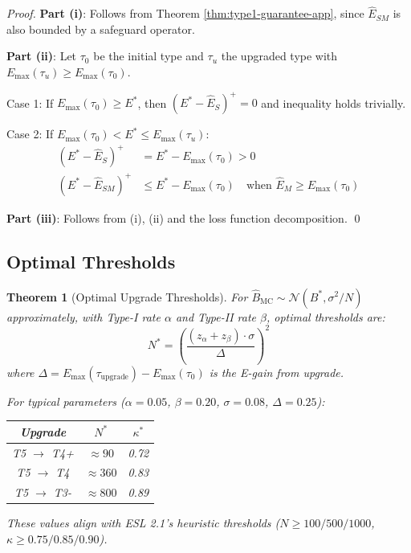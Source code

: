 \documentclass[11pt,a4paper]{article}
\newtheorem{theorem}{Theorem}[section]
\begin{document}
\begin{proof}
\textbf{Part (i)}: Follows from Theorem \ref{thm:type1-guarantee-app}, since $\hat{E}_{SM}$ is also bounded by a safeguard operator.

\textbf{Part (ii)}: Let $\tau_0$ be the initial type and $\tau_u$ the upgraded type with $E_{\max}(\tau_u) \geq E_{\max}(\tau_0)$.

Case 1: If $E_{\max}(\tau_0) \geq E^*$, then $(E^* - \hat{E}_S)^+ = 0$ and inequality holds trivially.

Case 2: If $E_{\max}(\tau_0) < E^* \leq E_{\max}(\tau_u)$:
\begin{align*}
(E^* - \hat{E}_S)^+ &= E^* - E_{\max}(\tau_0) > 0 \\
(E^* - \hat{E}_{SM})^+ &\leq E^* - E_{\max}(\tau_0) \quad \text{when } \hat{E}_M \geq E_{\max}(\tau_0)
\end{align*}

\textbf{Part (iii)}: Follows from (i), (ii) and the loss function decomposition. \qed
\end{proof}

\subsection{Optimal Thresholds}

\begin{theorem}[Optimal Upgrade Thresholds]
\label{thm:optimal-thresholds-app}
For $\hat{B}_{\mathrm{MC}} \sim \mathcal{N}(B^*, \sigma^2/N)$ approximately, with Type-I rate $\alpha$ and Type-II rate $\beta$, optimal thresholds are:
\[
N^* = \left(\frac{(z_\alpha + z_\beta) \cdot \sigma}{\Delta}\right)^2
\]
where $\Delta = E_{\max}(\tau_{\mathrm{upgrade}}) - E_{\max}(\tau_0)$ is the E-gain from upgrade.

For typical parameters ($\alpha = 0.05$, $\beta = 0.20$, $\sigma = 0.08$, $\Delta = 0.25$):
\begin{center}
\begin{tabular}{ccc}
\toprule
Upgrade & $N^*$ & $\kappa^*$ \\
\midrule
T5 $\to$ T4+ & $\approx 90$ & 0.72 \\
T5 $\to$ T4 & $\approx 360$ & 0.83 \\
T5 $\to$ T3- & $\approx 800$ & 0.89 \\
\bottomrule
\end{tabular}
\end{center}

These values align with ESL 2.1's heuristic thresholds ($N \geq 100/500/1000$, $\kappa \geq 0.75/0.85/0.90$).
\end{theorem}
\end{document}
